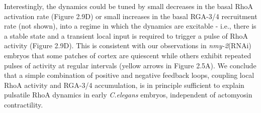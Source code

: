 \documentclass{ucetd}
\begin{document}
Interestingly, the dynamics could be tuned by small decreases in the basal RhoA activation rate (Figure 2.9D) or small increases in the basal RGA-3/4 recruitment rate (not shown), into a regime in which the dynamics are excitable - i.e., there is a stable state and a transient local input is required to trigger a pulse of RhoA activity (Figure 2.9D).  This is consistent with our observations in \textit{nmy-2}(RNAi) embryos that some patches of cortex are quiescent while others exhibit repeated pulses of activity at regular intervals (yellow arrows in Figure 2.5A). We conclude that a simple combination of positive and negative feedback loops, coupling local RhoA activity and RGA-3/4 accumulation, is in principle sufficient to explain pulsatile RhoA dynamics in early \textit{C.elegans} embryos, independent of actomyosin contractility.
\end{document}
